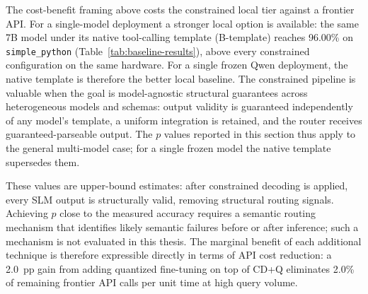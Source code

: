 The cost-benefit framing above costs the constrained local tier against a
frontier API. For a single-model deployment a stronger local option is
available: the same 7B model under its native tool-calling template
(B-template) reaches 96.00\% on \texttt{simple\_python}
(Table~\ref{tab:baseline-results}), above every constrained configuration
on the same hardware. For a single frozen Qwen deployment, the native template
is therefore the better local baseline. The constrained pipeline is valuable
when the goal is model-agnostic structural guarantees across heterogeneous
models and schemas: output validity is guaranteed independently of any model's
template, a uniform integration is retained, and the router receives
guaranteed-parseable output. The $p$ values reported in this section thus apply
to the general multi-model case; for a single frozen model the native template
supersedes them.

These values are upper-bound estimates: after constrained decoding is
applied, every SLM output is structurally valid, removing structural
routing signals. Achieving $p$ close to the measured accuracy requires a
semantic routing mechanism that identifies likely semantic failures before
or after inference; such a mechanism is not evaluated in this thesis.
The marginal benefit of each additional technique is therefore expressible
directly in terms of API cost reduction: a 2.0~pp gain from adding
quantized fine-tuning on top of CD+Q eliminates 2.0\% of remaining
frontier API calls per unit time at high query volume.


